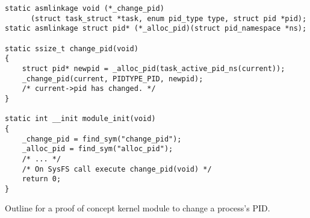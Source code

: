 \documentclass[a4paper,12pt,twoside,openright]{report}
\begin{document}
\begin{listing}[h]
\begin{verbatim}
static asmlinkage void (*_change_pid)
      (struct task_struct *task, enum pid_type type, struct pid *pid);
static asmlinkage struct pid* (*_alloc_pid)(struct pid_namespace *ns);

static ssize_t change_pid(void)
{
    struct pid* newpid = _alloc_pid(task_active_pid_ns(current));
    _change_pid(current, PIDTYPE_PID, newpid);
    /* current->pid has changed. */
}

static int __init module_init(void)
{
    _change_pid = find_sym("change_pid");
    _alloc_pid = find_sym("alloc_pid");
    /* ... */
    /* On SysFS call execute change_pid(void) */
    return 0;
}

\end{verbatim}
\caption{Outline for a proof of concept kernel module to change a process's PID.}
\end{listing}

 
 

\end{document}
